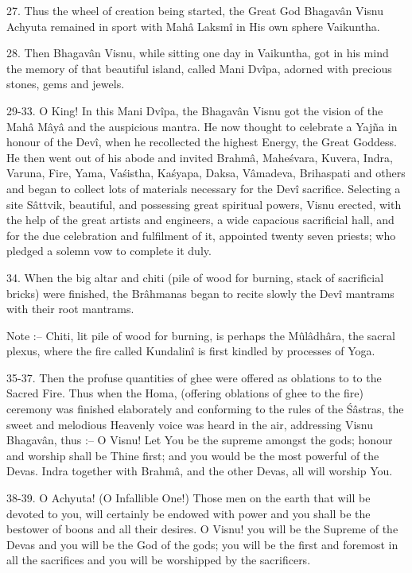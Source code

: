 27. Thus the wheel of creation being started, the Great God Bhagav\^an Visnu Achyuta remained in sport with Mah\^a Laksm\^i in His own sphere Vaikuntha.

28. Then Bhagav\^an Visnu, while sitting one day in Vaikuntha, got in his mind the memory of that beautiful island, called Mani Dv\^ipa, adorned with precious stones, gems and jewels.

29-33. O King! In this Mani Dv\^ipa, the Bhagav\^an Visnu got the vision of the Mah\^a M\^ay\^a and the auspicious mantra. He now thought to celebrate a Yaj\~na in honour of the Dev\^i, when he recollected the highest Energy, the Great Goddess. He then went out of his abode and invited Brahm\^a, Mahe\'svara, Kuvera, Indra, Varuna, Fire, Yama, Va\'sistha, Ka\'syapa, Daksa, V\^amadeva, Brihaspati and others and began to collect lots of materials necessary for the Dev\^i sacrifice. Selecting a site S\^attvik, beautiful, and possessing great spiritual powers, Visnu erected, with the help of the great artists and engineers, a wide capacious sacrificial hall, and for the due celebration and fulfilment of it, appointed twenty seven priests; who pledged a solemn vow to complete it duly.

34. When the big altar and chiti (pile of wood for burning, stack of sacrificial bricks) were finished, the Br\^ahmanas began to recite slowly the Dev\^i mantrams with their root mantrams.

Note :-- Chiti, lit pile of wood for burning, is perhaps the Mûl\^adh\^ara, the sacral plexus, where the fire called Kundalin\^i is first kindled by processes of Yoga.

35-37. Then the profuse quantities of ghee were offered as oblations to to the Sacred Fire. Thus when the Homa, (offering oblations of ghee to the fire) ceremony was finished elaborately and conforming to the rules of the \'S\^astras, the sweet and melodious Heavenly voice was heard in the air, addressing Visnu Bhagav\^an, thus :-- O Visnu! Let You be the supreme amongst the gods; honour and worship shall be Thine first; and you would be the most powerful of the Devas. Indra together with Brahm\^a, and the other Devas, all will worship You.

38-39. O Achyuta! (O Infallible One!) Those men on the earth that will be devoted to you, will certainly be endowed with power and you shall be the bestower of boons and all their desires. O Visnu! you will be the Supreme of the Devas and you will be the God of the gods; you will be the first and foremost in all the sacrifices and you will be worshipped by the sacrificers.

